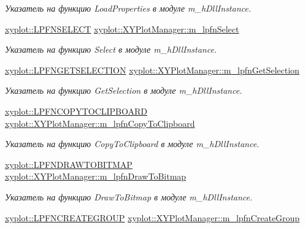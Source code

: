 \begin{DoxyCompactItemize}
\begin{DoxyCompactList}\small\item\em Указатель на функцию Load\-Properties в модуле m\-\_\-h\-Dll\-Instance. \end{DoxyCompactList}\item 
\hyperlink{namespacexyplot_a8a0a6d08dd052f79805399d35f400536}{xyplot\-::\-L\-P\-F\-N\-S\-E\-L\-E\-C\-T} \hyperlink{group__gr_func_pointers_ga4be55c9f4df8ac61fd6735edfe546eb6}{xyplot\-::\-X\-Y\-Plot\-Manager\-::m\-\_\-lpfn\-Select}
\begin{DoxyCompactList}\small\item\em Указатель на функцию Select в модуле m\-\_\-h\-Dll\-Instance. \end{DoxyCompactList}\item 
\hyperlink{namespacexyplot_accdc65e18386127090607d48d4d6ef55}{xyplot\-::\-L\-P\-F\-N\-G\-E\-T\-S\-E\-L\-E\-C\-T\-I\-O\-N} \hyperlink{group__gr_func_pointers_gab3365cbe41762a81c38364e87871cf33}{xyplot\-::\-X\-Y\-Plot\-Manager\-::m\-\_\-lpfn\-Get\-Selection}
\begin{DoxyCompactList}\small\item\em Указатель на функцию Get\-Selection в модуле m\-\_\-h\-Dll\-Instance. \end{DoxyCompactList}\item 
\hyperlink{namespacexyplot_a64a77ea08258ed9ffc0bf7ffda3da7a4}{xyplot\-::\-L\-P\-F\-N\-C\-O\-P\-Y\-T\-O\-C\-L\-I\-P\-B\-O\-A\-R\-D} \hyperlink{group__gr_func_pointers_gaaa80069b8151f0ac44feb1d2c822cf37}{xyplot\-::\-X\-Y\-Plot\-Manager\-::m\-\_\-lpfn\-Copy\-To\-Clipboard}
\begin{DoxyCompactList}\small\item\em Указатель на функцию Copy\-To\-Clipboard в модуле m\-\_\-h\-Dll\-Instance. \end{DoxyCompactList}\item 
\hyperlink{namespacexyplot_abe5bcbe4527096dba3cee83119449785}{xyplot\-::\-L\-P\-F\-N\-D\-R\-A\-W\-T\-O\-B\-I\-T\-M\-A\-P} \hyperlink{group__gr_func_pointers_gac78dbe52f4384dce76714ab7af98d53f}{xyplot\-::\-X\-Y\-Plot\-Manager\-::m\-\_\-lpfn\-Draw\-To\-Bitmap}
\begin{DoxyCompactList}\small\item\em Указатель на функцию Draw\-To\-Bitmap в модуле m\-\_\-h\-Dll\-Instance. \end{DoxyCompactList}\item 
\hyperlink{namespacexyplot_ab1a3054ba818e5b40da27a562af9714c}{xyplot\-::\-L\-P\-F\-N\-C\-R\-E\-A\-T\-E\-G\-R\-O\-U\-P} \hyperlink{group__gr_func_pointers_gafe7e6b9cda98ce4ad3e328a195b21883}{xyplot\-::\-X\-Y\-Plot\-Manager\-::m\-\_\-lpfn\-Create\-Group}

\end{DoxyCompactItemize}
